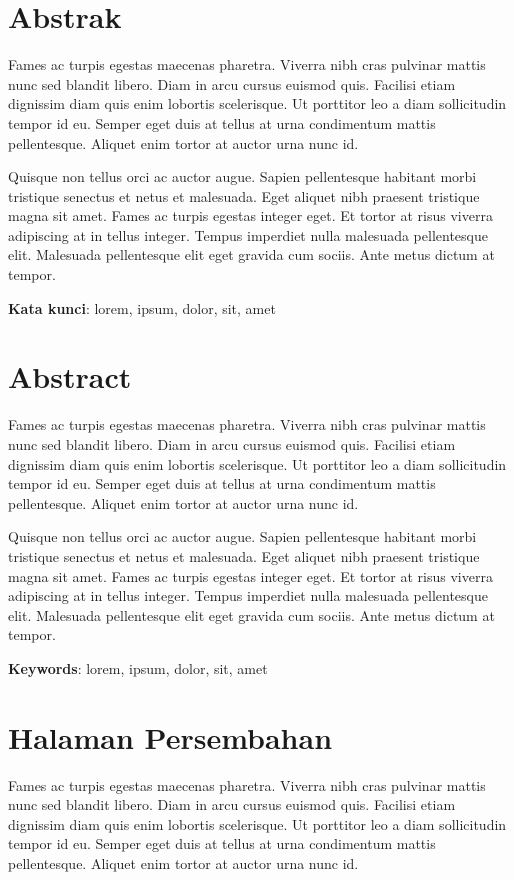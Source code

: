 \documentclass[12pt,hidelinks]{report}
\begin{document}

\chapter*{Abstrak}
Fames ac turpis egestas maecenas pharetra. Viverra nibh cras pulvinar mattis nunc sed blandit libero. Diam in arcu cursus euismod quis. Facilisi etiam dignissim diam quis enim lobortis scelerisque. Ut porttitor leo a diam sollicitudin tempor id eu. Semper eget duis at tellus at urna condimentum mattis pellentesque. Aliquet enim tortor at auctor urna nunc id.

Quisque non tellus orci ac auctor augue. Sapien pellentesque habitant morbi tristique senectus et netus et malesuada. Eget aliquet nibh praesent tristique magna sit amet. Fames ac turpis egestas integer eget. Et tortor at risus viverra adipiscing at in tellus integer. Tempus imperdiet nulla malesuada pellentesque elit. Malesuada pellentesque elit eget gravida cum sociis. Ante metus dictum at tempor.

\vspace{0.5cm}

\textbf{Kata kunci}: lorem, ipsum, dolor, sit, amet
 
 
 \chapter*{Abstract}
 Fames ac turpis egestas maecenas pharetra. Viverra nibh cras pulvinar mattis nunc sed blandit libero. Diam in arcu cursus euismod quis. Facilisi etiam dignissim diam quis enim lobortis scelerisque. Ut porttitor leo a diam sollicitudin tempor id eu. Semper eget duis at tellus at urna condimentum mattis pellentesque. Aliquet enim tortor at auctor urna nunc id.
 
 Quisque non tellus orci ac auctor augue. Sapien pellentesque habitant morbi tristique senectus et netus et malesuada. Eget aliquet nibh praesent tristique magna sit amet. Fames ac turpis egestas integer eget. Et tortor at risus viverra adipiscing at in tellus integer. Tempus imperdiet nulla malesuada pellentesque elit. Malesuada pellentesque elit eget gravida cum sociis. Ante metus dictum at tempor.
 
 \vspace{0.5cm}
 
 \textbf{Keywords}: lorem, ipsum, dolor, sit, amet
 
\chapter*{Halaman Persembahan}
Fames ac turpis egestas maecenas pharetra. Viverra nibh cras pulvinar mattis nunc sed blandit libero. Diam in arcu cursus euismod quis. Facilisi etiam dignissim diam quis enim lobortis scelerisque. Ut porttitor leo a diam sollicitudin tempor id eu. Semper eget duis at tellus at urna condimentum mattis pellentesque. Aliquet enim tortor at auctor urna nunc id.
\end{document}
